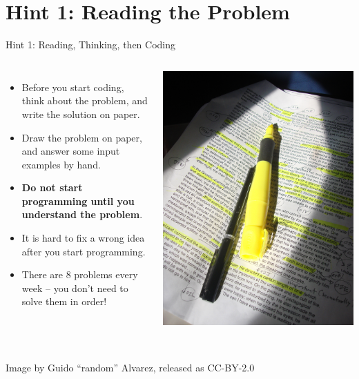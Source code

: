 \section{Hint 1: Reading the Problem}
\begin{frame}{Hint 1: Reading, Thinking, then Coding}

  \begin{columns}
    \begin{itemize}
    \item Before you start coding, think about the problem, and write the solution on paper.\medskip


    \item Draw the problem on paper, and answer some input examples by hand.\medskip

    \item {\bf Do not start programming until you understand the problem}.\medskip

    \item It is hard to fix a wrong idea after you start programming.\medskip

    \item There are 8 problems every week -- you don't need to solve them in order!
    \end{itemize}
    \includegraphics[width=\textwidth]{../img/textmarker}
  \end{columns}

  \vfill

  \hrulefill\\
  \hfill {\tiny Image by Guido ``random'' Alvarez, released as CC-BY-2.0}
\end{frame}

